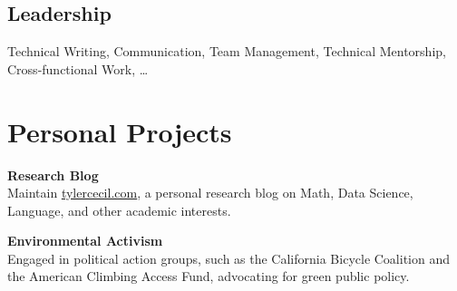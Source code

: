 \documentclass{tc_cv}
\begin{document}
\begin{minipage}[t]{0.3\linewidth}
  \subsection{Leadership}
  Technical Writing,
  Communication,
  Team Management,
  Technical Mentorship,
  Cross-functional Work,
  \ldots

  \vspace{1.5em}
  \section{Personal Projects}
  \textbf{Research Blog}\\
  Maintain \href{https://tylercecil.com}{\ul{tylercecil.com}}, a personal
  research blog on Math, Data Science, Language, and other academic interests.

  \vspace{0.5em}
  \textbf{Environmental Activism}\\
  Engaged in political action groups, such as the California Bicycle Coalition
  and the American Climbing Access Fund, advocating for green public policy.

\end{minipage}
\hfill\vline\hfill
\end{document}

